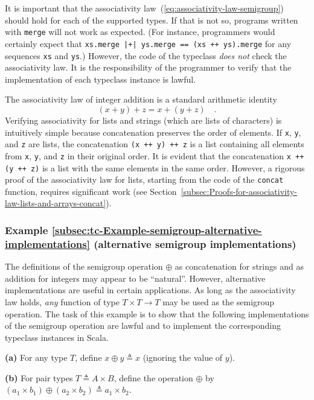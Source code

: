 It is important that the associativity law~(\ref{eq:associativity-law-semigroup})
should hold for each of the supported types. If that is not so, programs
written with \lstinline!merge! will not work as expected. (For instance,
programmers would certainly expect that \lstinline!xs.merge |+| ys.merge == (xs ++ ys).merge!
for any sequences \lstinline!xs! and \lstinline!ys!.) However, the
code of the typeclass \emph{does not} check the associativity law.
It is the responsibility of the programmer to verify that the implementation
of each typeclass instance is lawful. 

The associativity law of integer addition is a standard arithmetic
identity
\[
\left(x+y\right)+z=x+\left(y+z\right)\quad.
\]
Verifying associativity for lists and strings (which are lists of
characters) is intuitively simple because concatenation preserves
the order of elements. If \lstinline!x!, \lstinline!y!, and \lstinline!z!
are lists, the concatenation \lstinline!(x ++ y) ++ z! is a list
containing all elements from \lstinline!x!, \lstinline!y!, and \lstinline!z!
in their original order. It is evident that the concatenation \lstinline!x ++ (y ++ z)!
is a list with the same elements in the same order. However, a rigorous
proof of the associativity law for lists, starting from the code of
the \lstinline!concat! function, requires significant work (see Section~\ref{subsec:Proofs-for-associativity-law-lists-and-arrays-concat}). 

\subsubsection{Example \label{subsec:tc-Example-semigroup-alternative-implementations}\ref{subsec:tc-Example-semigroup-alternative-implementations}
(alternative semigroup implementations)}

The definitions of the semigroup operation $\oplus$ as concatenation
for strings and as addition for integers may appear to be \textsf{``}natural\textsf{''}.
However, alternative implementations are useful in certain applications.
As long as the associativity law holds, \emph{any} function of type
$T\times T\rightarrow T$ may be used as the semigroup operation.
The task of this example is to show that the following implementations
of the semigroup operation are lawful and to implement the corresponding
typeclass instances in Scala.

\textbf{(a)} For any type $T$, define $x\oplus y\triangleq x$ (ignoring
the value of $y$).

\textbf{(b)} For pair types $T\triangleq A\times B$, define the operation
$\oplus$ by $\left(a_{1}\times b_{1}\right)\oplus\left(a_{2}\times b_{2}\right)\triangleq a_{1}\times b_{2}$.

